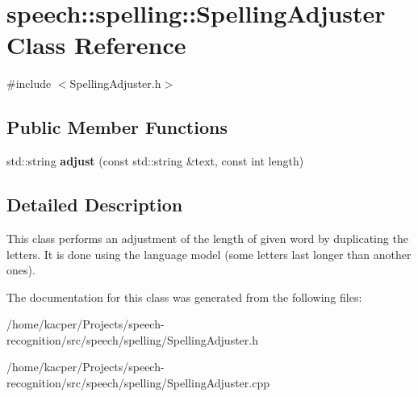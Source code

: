 \hypertarget{classspeech_1_1spelling_1_1SpellingAdjuster}{\section{speech\+:\+:spelling\+:\+:Spelling\+Adjuster Class Reference}
\label{classspeech_1_1spelling_1_1SpellingAdjuster}
}


{\ttfamily \#include $<$Spelling\+Adjuster.\+h$>$}

\subsection*{Public Member Functions}
\begin{DoxyCompactItemize}
\item 
\hypertarget{classspeech_1_1spelling_1_1SpellingAdjuster_af4a4c7a1aa754a5a0c4bf1a1019edc66}{std\+::string {\bfseries adjust} (const std\+::string \&text, const int length)}\label{classspeech_1_1spelling_1_1SpellingAdjuster_af4a4c7a1aa754a5a0c4bf1a1019edc66}

\end{DoxyCompactItemize}


\subsection{Detailed Description}
This class performs an adjustment of the length of given word by duplicating the letters. It is done using the language model (some letters last longer than another ones). 

The documentation for this class was generated from the following files\+:\begin{DoxyCompactItemize}
\item 
/home/kacper/\+Projects/speech-\/recognition/src/speech/spelling/Spelling\+Adjuster.\+h\item 
/home/kacper/\+Projects/speech-\/recognition/src/speech/spelling/Spelling\+Adjuster.\+cpp\end{DoxyCompactItemize}
